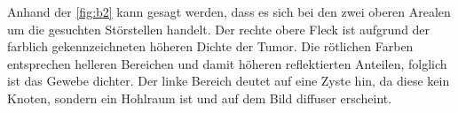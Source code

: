 Anhand der \autoref{fig:b2} kann gesagt werden, dass es sich bei den zwei oberen Arealen um die gesuchten
Störstellen handelt. Der rechte obere Fleck ist aufgrund der farblich gekennzeichneten höheren Dichte der Tumor.
Die rötlichen Farben entsprechen helleren Bereichen und damit höheren reflektierten Anteilen, folglich ist das Gewebe dichter.
Der linke Bereich deutet auf eine Zyste hin, da diese kein Knoten, sondern ein Hohlraum ist und auf dem Bild diffuser erscheint.

